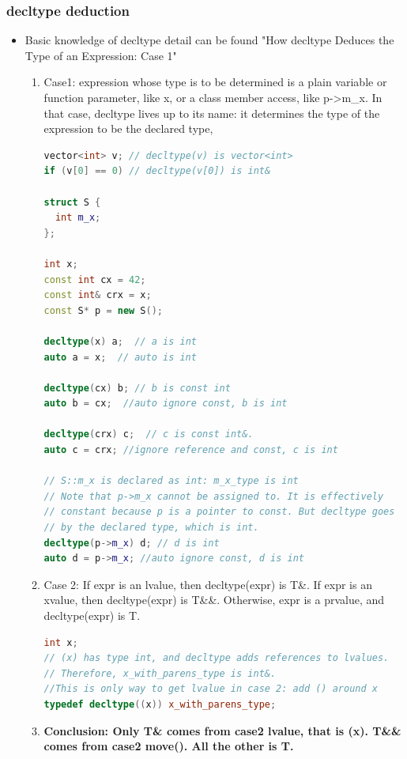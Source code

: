 \documentclass[a4paper,12pt,twoside]{book}
\begin{document}
\subsubsection{decltype deduction}
\begin{itemize}
\item Basic knowledge of decltype detail can be found "How decltype Deduces the Type of an Expression: Case 1"

\begin{enumerate}
\item Case1: expression whose type is to be determined is a plain variable or function parameter, like x, or a class member access, like p->m\_x. In that case, decltype lives up to its name: it determines the type of the expression to be the declared type,
\begin{lstlisting}[frame=single, language=c++]
vector<int> v; // decltype(v) is vector<int>
if (v[0] == 0) // decltype(v[0]) is int&

struct S {
  int m_x;
};

int x;
const int cx = 42;
const int& crx = x;
const S* p = new S();

decltype(x) a;  // a is int
auto a = x;  // auto is int

decltype(cx) b; // b is const int
auto b = cx;  //auto ignore const, b is int

decltype(crx) c;  // c is const int&.
auto c = crx; //ignore reference and const, c is int

// S::m_x is declared as int: m_x_type is int
// Note that p->m_x cannot be assigned to. It is effectively
// constant because p is a pointer to const. But decltype goes
// by the declared type, which is int.
decltype(p->m_x) d; // d is int
auto d = p->m_x; //auto ignore const, d is int
\end{lstlisting}

\item Case 2: If expr is an lvalue, then decltype(expr) is T\&. If expr is an xvalue, then decltype(expr) is T\&\&. Otherwise, expr is a prvalue, and decltype(expr) is T.

\begin{lstlisting}[frame=single, language=c++]
int x;
// (x) has type int, and decltype adds references to lvalues.
// Therefore, x_with_parens_type is int&.
//This is only way to get lvalue in case 2: add () around x
typedef decltype((x)) x_with_parens_type;
\end{lstlisting}

\item \textbf{Conclusion: Only T\& comes from case2 lvalue, that is (x). T\&\& comes from case2 move().  All the other is T.}
\end{enumerate}


\end{itemize}
\end{document}
